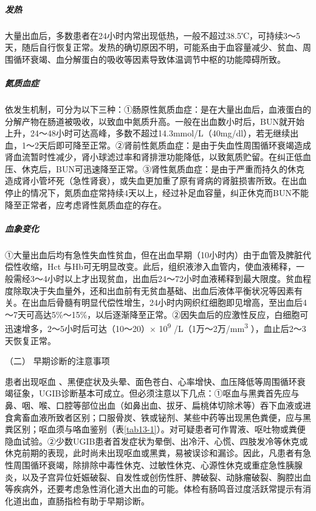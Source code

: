 \subparagraph{发热}

大量出血后，多数患者在24小时内常出现低热，一般不超过38.5℃，可持续3～5天，随后自行恢复正常。发热的确切原因不明，可能系由于血容量减少、贫血、周围循环衰竭、血分解蛋白的吸收等因素导致体温调节中枢的功能障碍所致。

\subparagraph{氮质血症}

依发生机制，可分为以下三种：①肠原性氮质血症：是在大量出血后，血液蛋白的分解产物在肠道被吸收，以致血中氮质升高。一般在出血数小时后，BUN就开始上升，24～48小时可达高峰，多数不超过14.3mmol/L（40mg/dl），若无继续出血，1～2天后即可降至正常。②肾前性氮质血症：是由于失血性周围循环衰竭造成肾血流暂时性减少，肾小球滤过率和肾排泄功能降低，以致氮质贮留。在纠正低血压、休克后，BUN可迅速降至正常。③肾性氮质血症：是由于严重而持久的休克造成肾小管坏死（急性肾衰），或失血更加重了原有肾病的肾脏损害所致。在出血停止的情况下，氮质血症常持续4天以上，经过补足血容量，纠正休克而BUN不能降至正常者，应考虑肾性氮质血症的存在。

\subparagraph{血象变化}

①大量出血后均有急性失血性贫血，但在出血早期（10小时内）由于血管及脾脏代偿性收缩，Hct
与Hb可无明显改变。此后，组织液渗入血管内，使血液稀释，一般需经3～4小时以上才出现贫血，出血后24～72小时血液稀释到最大限度。贫血程度除取决于失血量外，还和出血前有无贫血基础、出血后液体平衡状况等因素有关。在出血后骨髓有明显代偿性增生，24小时内网织红细胞即见增高，至出血后4～7天可高达5\%～15\%，以后逐渐降至正常。②因失血后的应激性反应，白细胞可迅速增多，2～5小时后可达（10～20）×
10\textsuperscript{9} /L（1万～2万/mm\textsuperscript{3}
），血止后2～3天恢复正常。

\hypertarget{text00032.htmlux5cux23CHP1-13-1-4-1-2}{}
（二） 早期诊断的注意事项

患者出现呕血
、黑便症状及头晕、面色苍白、心率增快、血压降低等周围循环衰竭征象，UGIB诊断基本可成立。但必须注意以下几点：①呕血与黑粪首先应与鼻、咽、喉、口腔等部位出血（如鼻出血、拔牙、扁桃体切除术等）吞下血液或进食禽畜血液所致者区别；口服骨炭、铁或铋剂、某些中药等出现黑色粪便，应与黑粪区别；呕血须与咯血鉴别（表\ref{tab13-1}）。对可疑患者可作胃液、呕吐物或粪便隐血试验。②少数UGIB患者首发症状为晕倒、出冷汗、心慌、四肢发冷等休克或休克前期的表现，此时尚未出现呕血或黑粪，易被误诊和漏诊。因此，凡患者有急性周围循环衰竭，除排除中毒性休克、过敏性休克、心源性休克或重症急性胰腺炎，以及子宫异位妊娠破裂、自发性或创伤性肝、脾破裂、动脉瘤破裂、胸腔出血等疾病外，还要考虑急性消化道大出血的可能。体检有肠鸣音过度活跃常提示有消化道出血，直肠指检有助于早期诊断。

